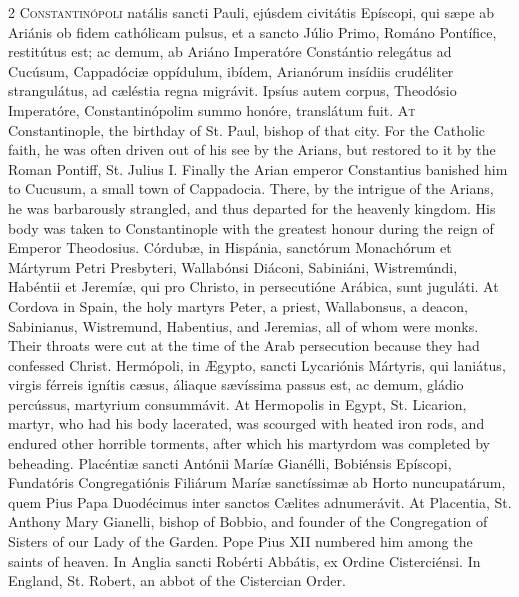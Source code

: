\begin{paracol}{2}
\lettrine[lines=2]{C}{onstantinópoli} natális 
 sancti Pauli, ejúsdem civitátis Epíscopi, qui sæpe ab Ariánis ob fidem 
 cathólicam pulsus, et a sancto Júlio Primo, Románo Pontífice, restitútus est; 
 ac demum, ab Ariáno Imperatóre Constántio relegátus ad Cucúsum, Cappadóciæ 
 oppídulum, ibídem, Arianórum insídiis crudéliter strangulátus, ad cæléstia 
 regna migrávit. Ipsíus autem corpus, Theodósio Imperatóre, 
 Constantinópolim summo honóre, translátum fuit.
\switchcolumn
{}
\lettrine[lines=2]{A}{t} Constantinople, the birthday of 
 St. Paul, bishop of that city. For the Catholic faith, he was often 
 driven out of his see by the Arians, but restored to it by the Roman 
 Pontiff, St. Julius I. Finally the Arian emperor Constantius banished 
 him to Cucusum, a small town of Cappadocia. There, by the intrigue of 
 the Arians, he was barbarously strangled, and thus departed for the heavenly 
 kingdom. His body was taken to Constantinople with the greatest honour 
 during the reign of Emperor Theodosius.
\switchcolumn*
{}
Córdubæ, in Hispánia, 
 sanctórum Monachórum et Mártyrum Petri Presbyteri, Wallabónsi Diáconi, 
 Sabiniáni, Wistremúndi, Habéntii et Jeremíæ, qui pro Christo, in 
 persecutióne Arábica, sunt juguláti.
\switchcolumn
{}
At Cordova in Spain, the holy 
 martyrs Peter, a priest, Wallabonsus, a deacon, Sabinianus, Wistremund, 
 Habentius, and Jeremias, all of whom were monks. Their throats were 
 cut at the time of the Arab persecution because they had confessed Christ.
\switchcolumn*
{}
Hermópoli, in Ægypto, 
 sancti Lycariónis Mártyris, qui laniátus, virgis férreis ignítis cæsus, 
 áliaque sævíssima passus est, ac demum, gládio percússus, martyrium 
 consummávit.
\switchcolumn
{}
At Hermopolis in Egypt, St. Licarion, 
 martyr, who had his body lacerated, was scourged with heated iron rods, and 
 endured other horrible torments, after which his martyrdom was completed by 
 beheading.
\switchcolumn*
{}
Placéntiæ sancti 
 Antónii Maríæ Gianélli, Bobiénsis Epíscopi, Fundatóris Congregatiónis 
 Filiárum Maríæ sanctíssimæ ab Horto nuncupatárum, quem Pius Papa Duodécimus 
 inter sanctos Cælites adnumerávit.
\switchcolumn
{}
At Placentia, St. Anthony Mary 
 Gianelli, bishop of Bobbio, and founder of the Congregation of Sisters of 
 our Lady of the Garden. Pope Pius XII numbered him among the saints of 
 heaven.
\switchcolumn*
{}
In Anglia sancti 
 Robérti Abbátis, ex Ordine Cisterciénsi.
\switchcolumn
{}
In England, St. Robert, an abbot of 
 the Cistercian Order.
\switchcolumn*
{}
\end{paracol}


